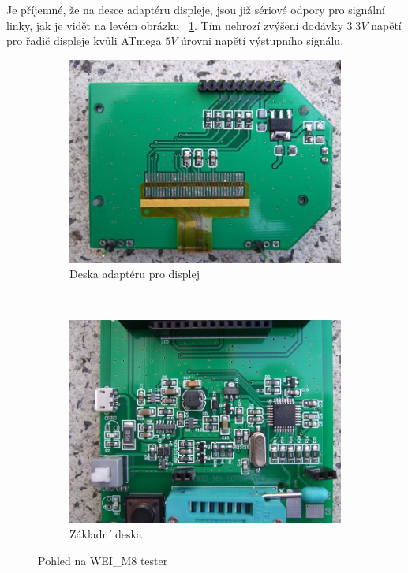 Je příjemné, že na desce adaptéru displeje, jsou již sériové odpory pro signální linky, jak je vidět
na levém obrázku ~\ref{fig:WeiM8int}. Tím nehrozí zvýšení dodávky \(3.3V\) napětí pro řadič displeje kvůli
ATmega \(5V\) úrovni napětí výstupního signálu.

\begin{figure}[H]
  \begin{subfigure}[b]{.5\textwidth}
    \centering
    \includegraphics[width=1.\textwidth]{../PNG/WEI_M8_D.JPG}
    \caption{Deska adaptéru pro displej}
  \end{subfigure}
  ~
  \begin{subfigure}[b]{.5\textwidth}
    \centering
    \includegraphics[width=1.\textwidth]{../PNG/WEI_M8_L.JPG}
    \caption{Základní deska}
  \end{subfigure}
  \caption{Pohled na  WEI\_M8 tester}
  \label{fig:WeiM8int}
\end{figure}


